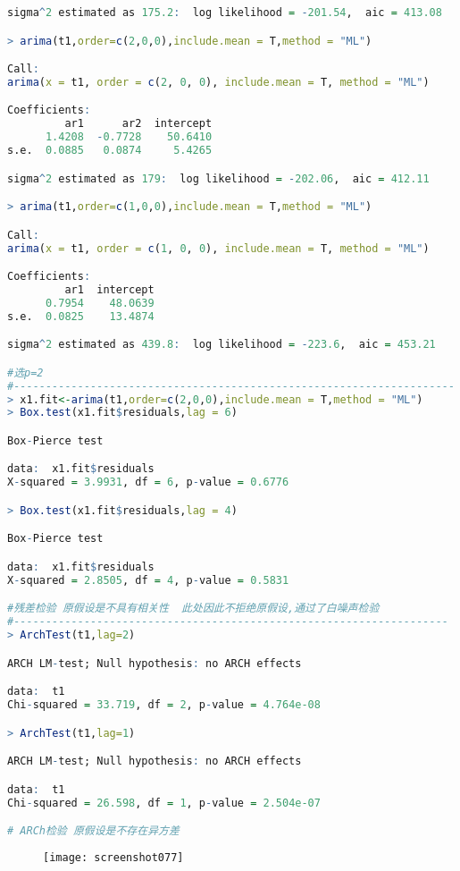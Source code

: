 \documentclass[11pt,a4paper,oneside]{book}
\begin{document}
\begin{lstlisting}[language=r]
sigma^2 estimated as 175.2:  log likelihood = -201.54,  aic = 413.08

> arima(t1,order=c(2,0,0),include.mean = T,method = "ML")

Call:
arima(x = t1, order = c(2, 0, 0), include.mean = T, method = "ML")

Coefficients:
         ar1      ar2  intercept
      1.4208  -0.7728    50.6410
s.e.  0.0885   0.0874     5.4265

sigma^2 estimated as 179:  log likelihood = -202.06,  aic = 412.11

> arima(t1,order=c(1,0,0),include.mean = T,method = "ML")

Call:
arima(x = t1, order = c(1, 0, 0), include.mean = T, method = "ML")

Coefficients:
         ar1  intercept
      0.7954    48.0639
s.e.  0.0825    13.4874

sigma^2 estimated as 439.8:  log likelihood = -223.6,  aic = 453.21

#选p=2
#---------------------------------------------------------------------
> x1.fit<-arima(t1,order=c(2,0,0),include.mean = T,method = "ML")
> Box.test(x1.fit$residuals,lag = 6)

Box-Pierce test

data:  x1.fit$residuals
X-squared = 3.9931, df = 6, p-value = 0.6776

> Box.test(x1.fit$residuals,lag = 4)

Box-Pierce test

data:  x1.fit$residuals
X-squared = 2.8505, df = 4, p-value = 0.5831

#残差检验 原假设是不具有相关性  此处因此不拒绝原假设,通过了白噪声检验
#--------------------------------------------------------------------
> ArchTest(t1,lag=2)

ARCH LM-test; Null hypothesis: no ARCH effects

data:  t1
Chi-squared = 33.719, df = 2, p-value = 4.764e-08

> ArchTest(t1,lag=1)

ARCH LM-test; Null hypothesis: no ARCH effects

data:  t1
Chi-squared = 26.598, df = 1, p-value = 2.504e-07

# ARCh检验 原假设是不存在异方差
\end{lstlisting}
\begin{figure}[H]
	\centering
	\texttt{[image: screenshot077]}
	\label{fig:screenshot077}
\end{figure}
\end{document}
